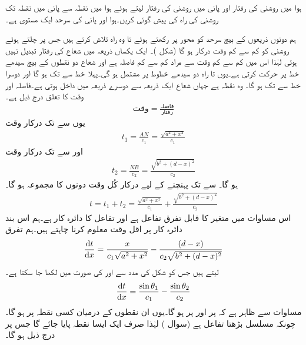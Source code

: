ہوا میں روشنی کی رفتار  اور پانی میں روشنی کی رفتار  لیتے ہوئے ہوا میں نقطہ  سے پانی میں نقطہ  تک روشنی کی راہ کی پیش گوئی کریں۔ہوا اور پانی کی سرحد  ایک مستوی  ہے۔

ہم دونوں ذریعوں کے بیچ سرحد کو محور  پر رکھتے ہوئے  تا  وہ راہ تلاش کرتے ہیں جس پر چلتے ہوئے روشنی کو کم سے کم وقت درکار ہو گا (شکل )۔ ایک یکساں ذریعہ میں شعاع کی رفتار تبدیل نہیں ہوتی   لہٰذا اس میں کم سے کم وقت سے مراد کم سے کم فاصلہ ہے اور شعاع دو نقطوں کے بیچ سیدھے خط پر حرکت کرتی ہے۔یوں  تا  راہ دو سیدھے خطوط پر مشتمل ہو گی۔پہلا خط  سے  تک ہو گا اور دوسرا خط  سے  تک ہو گا۔  وہ نقطہ ہے جہاں شعاع ایک ذریعہ سے دوسرے ذریعہ میں داخل ہوتی ہے۔فاصلہ  اور وقت کا تعلق درج ذیل ہے۔
\begin{align*}
\text{وقت}=\frac{\text{فاصلہ}}{\text{رفتار}}
\end{align*}
یوں  سے  تک درکار وقت
\begin{align*}
t_1=\frac{AN}{c_1}=\frac{\sqrt{a^2+x^2}}{c_1}
\end{align*}
اور  سے  تک درکار وقت
\begin{align*}
t_2=\frac{NB}{c_2}=\frac{\sqrt{b^2+(d-x)^2}}{c_2}
\end{align*}
ہو گا۔ سے  تک پہنچنے کے لیے درکار کُل وقت دونوں کا مجموعہ ہو گا۔
\begin{align}\label{مساوات_استعمال_فغما_الف}
t=t_1+t_2=\frac{\sqrt{a^2+x^2}}{c_1}+\frac{\sqrt{b^2+(d-x)^2}}{c_2}
\end{align}
اس مساوات میں  متغیر  کا قابل تفرق تفاعل ہے اور تفاعل کا دائرہ کار  ہے۔ہم اس بند دائرہ کار پر  اقل  وقت معلوم کرنا چاہتے ہیں۔ہم تفرق
 \begin{align}\label{مساوات_استعمال_فغما_ب}
\frac{\dif t}{\dif x}=\frac{x}{c_1\sqrt{a^2+x^2}}-\frac{(d-x)}{c_2\sqrt{b^2+(d-x)^2}}
\end{align}
لیتے ہیں جس کو شکل  کی مدد سے  اور  کی صورت میں لکھا جا سکتا ہے۔
\begin{align}\label{مساوات_استعمال_فغما_پ}
\frac{\dif t}{\dif x}=\frac{\sin \theta_1}{c_1}-\frac{\sin\theta_2}{c_2}
\end{align} 
مساوات  سے ظاہر ہے کہ  پر  اور  پر
  ہو گا۔یوں ان نقطوں کے درمیان کسی نقطہ  پر  ہو گا۔چونکہ   مسلسل بڑھتا تفاعل ہے (سوال ) لہٰذا صرف ایک ایسا نقطہ پایا جائے گا جس پر درج ذیل ہو گا۔

